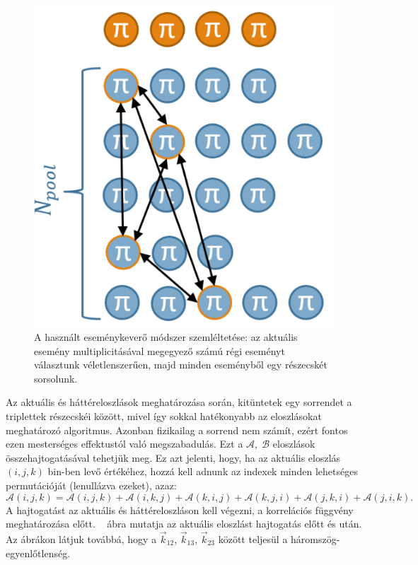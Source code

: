 \documentclass[11pt,a4paper]{article}
\numberwithin{equation}{subsection}
\numberwithin{figure}{section}
\begin{document}
\begin{figure}[H]
\centering
\includegraphics[scale=0.5]{pic/dat/mixingevents}
\caption{A használt eseménykeverő módszer szemléltetése: az aktuális esemény multiplicitásával megegyező számú régi eseményt választunk véletlenszerűen, majd minden eseményből egy részecskét sorsolunk.}
\label{fig:mixingevents}
\end{figure}


Az aktuális és háttéreloszlások meghatározása során, kitüntetek egy sorrendet a triplettek részecskéi között, mivel így sokkal hatékonyabb az eloszlásokat meghatározó algoritmus. Azonban fizikailag a sorrend nem számít, ezért fontos ezen mesterséges effektustól való megszabadulás. Ezt a $\mathcal{A},\; \mathcal{B}$ eloszlások összehajtogatásával tehetjük meg.  Ez azt jelenti, hogy, ha az aktuális eloszlás $(i,j,k)$ bin-ben levő értékéhez, hozzá kell adnunk az indexek minden lehetséges permutációját (lenullázva ezeket), azaz:
\begin{equation}
\mathcal{A}(i, j, k) = \mathcal{A}(i,j,k) + \mathcal{A}(i, k, j) + \mathcal{A}(k, i, j) + \mathcal{A}(k, j, i) + \mathcal{A}(j, k, i) + \mathcal{A}(j, i, k).
\end{equation}
A hajtogatást az aktuális és háttéreloszláson kell végezni, a korrelációs függvény meghatározása előtt. ~ ábra mutatja az aktuális eloszlást hajtogatás előtt és után. Az ábrákon látjuk továbbá, hogy a $\vec{k}_{12}$, $\vec{k}_{13}$, $\vec{k}_{23}$ között teljesül a háromszög-egyenlőtlenség.
\end{document}
